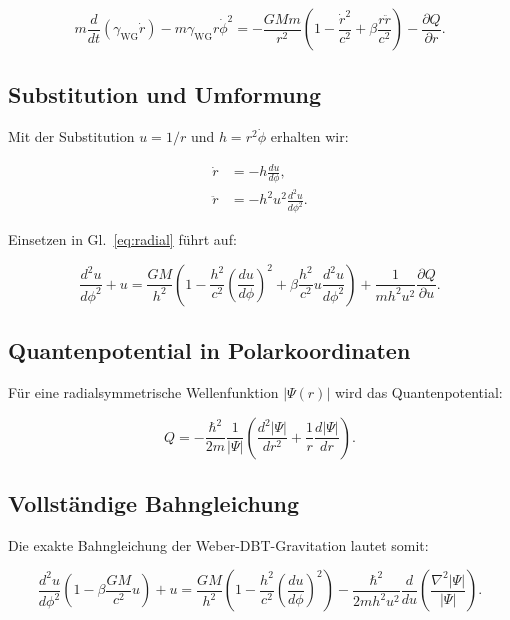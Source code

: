 \begin{equation}
m \frac{d}{dt} (\gamma_{\text{WG}} \dot{r}) - m \gamma_{\text{WG}} r \dot{\phi}^2 = -\frac{GMm}{r^2} \left(1 - \frac{\dot{r}^2}{c^2} + \beta \frac{r \ddot{r}}{c^2}\right) - \frac{\partial Q}{\partial r}.
\label{eq:radial}
\end{equation}

\subsection{Substitution und Umformung}
Mit der Substitution \( u = 1/r \) und \( h = r^2 \dot{\phi} \) erhalten wir:

\begin{align}
\dot{r} &= -h \frac{du}{d\phi}, \\
\ddot{r} &= -h^2 u^2 \frac{d^2 u}{d\phi^2}.
\end{align}

Einsetzen in Gl.~\eqref{eq:radial} führt auf:

\begin{equation}
\frac{d^2 u}{d\phi^2} + u = \frac{GM}{h^2} \left(1 - \frac{h^2}{c^2} \left(\frac{du}{d\phi}\right)^2 + \beta \frac{h^2}{c^2} u \frac{d^2 u}{d\phi^2}\right) + \frac{1}{m h^2 u^2} \frac{\partial Q}{\partial u}.
\label{eq:hauptgleichung}
\end{equation}

\subsection{Quantenpotential in Polarkoordinaten}
Für eine radialsymmetrische Wellenfunktion \( |\Psi(r)| \) wird das Quantenpotential:

\begin{equation}
Q = -\frac{\hbar^2}{2m} \frac{1}{|\Psi|} \left(\frac{d^2 |\Psi|}{dr^2} + \frac{1}{r} \frac{d|\Psi|}{dr}\right).
\end{equation}

\subsection{Vollständige Bahngleichung}
Die exakte Bahngleichung der Weber-DBT-Gravitation lautet somit:

\begin{equation}
\frac{d^2 u}{d\phi^2} \left(1 - \beta \frac{GM}{c^2} u\right) + u = \frac{GM}{h^2} \left(1 - \frac{h^2}{c^2} \left(\frac{du}{d\phi}\right)^2\right) - \frac{\hbar^2}{2m h^2 u^2} \frac{d}{du} \left(\frac{\nabla^2 |\Psi|}{|\Psi|}\right).
\label{eq:final}
\end{equation}

